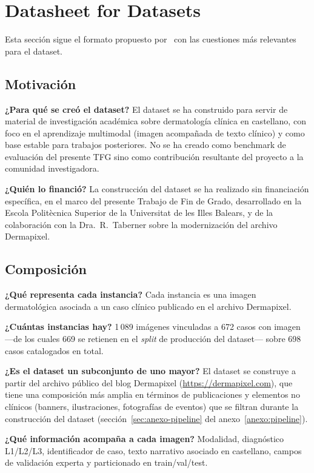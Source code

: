 \section{Datasheet for Datasets}
\label{sec:dataset-datasheet}

Esta sección sigue el formato propuesto por~\cite{datasheets2018}
con las cuestiones más relevantes para el dataset.

\subsection*{Motivación}

\textbf{¿Para qué se creó el dataset?} El dataset se ha construido
para servir de material de investigación académica sobre
dermatología clínica en castellano, con foco en el aprendizaje
multimodal (imagen acompañada de texto clínico) y como base
estable para trabajos posteriores. No se ha creado como benchmark
de evaluación del presente TFG sino como contribución resultante
del proyecto a la comunidad investigadora.

\textbf{¿Quién lo financió?} La construcción del dataset se ha
realizado sin financiación específica, en el marco del presente
Trabajo de Fin de Grado, desarrollado en la Escola Politècnica
Superior de la Universitat de les Illes Balears, y de la colaboración
con la Dra.~R.~Taberner sobre la modernización del archivo
Dermapixel.

\subsection*{Composición}

\textbf{¿Qué representa cada instancia?} Cada instancia es una
imagen dermatológica asociada a un caso clínico publicado en el
archivo Dermapixel.

\textbf{¿Cuántas instancias hay?} 1\,089 imágenes vinculadas a 672
casos con imagen ---de los cuales 669 se retienen en el \emph{split}
de producción del dataset--- sobre 698 casos catalogados en total.

\textbf{¿Es el dataset un subconjunto de uno mayor?} El dataset se
construye a partir del archivo público del blog Dermapixel
(\url{https://dermapixel.com}), que tiene una composición más amplia
en términos de publicaciones y elementos no clínicos (banners,
ilustraciones, fotografías de eventos) que se filtran durante la
construcción del dataset (sección~\ref{sec:anexo-pipeline} del
anexo~\ref{anexo:pipeline}).

\textbf{¿Qué información acompaña a cada imagen?} Modalidad,
diagnóstico L1/L2/L3, identificador de caso, texto narrativo
asociado en castellano, campos de validación experta y
particionado en train/val/test.

